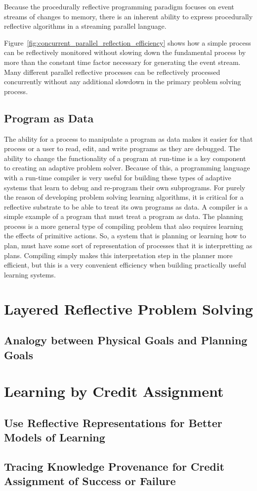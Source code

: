 Because the procedurally reflective programming paradigm focuses on
event streams of changes to memory, there is an inherent ability to
express procedurally reflective algorithms in a streaming parallel
language.

Figure~\ref{fig:concurrent_parallel_reflection_efficiency} shows how a
simple process can be reflectively monitored without slowing down the
fundamental process by more than the constant time factor necessary
for generating the event stream.  Many different parallel reflective
processes can be reflectively processed concurrently without any
additional slowdown in the primary problem solving process.

\subsection{Program as Data}

The ability for a process to manipulate a program as data makes it
easier for that process or a user to read, edit, and write programs as
they are debugged.  The ability to change the functionality of a
program at run-time is a key component to creating an adaptive problem
solver.  Because of this, a programming language with a run-time
compiler is very useful for building these types of adaptive systems
that learn to debug and re-program their own subprograms.  For purely
the reason of developing problem solving learning algorithms, it is
critical for a reflective substrate to be able to treat its own
programs as data.  A compiler is a simple example of a program that
must treat a program as data.  The planning process is a more general
type of compiling problem that also requires learning the effects of
primitive actions.  So, a system that is planning or learning how to
plan, must have some sort of representation of processes that it is
interpretting as plans.  Compiling simply makes this interpretation
step in the planner more efficient, but this is a very convenient
efficiency when building practically useful learning systems.


\section{Layered Reflective Problem Solving}

\subsection{Analogy between Physical Goals and Planning Goals}


\section{Learning by Credit Assignment}

\subsection{Use Reflective Representations for Better Models of Learning}

\subsection{Tracing Knowledge Provenance for Credit Assignment of Success or Failure}



